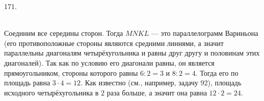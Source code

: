 171. \begin{figure}[ht!]
\end{figure}\\
Соединим все середины сторон. Тогда $MNKL$ --- это параллелограмм Вариньона (его противоположные стороны являются средними линиями, а значит параллельны диагоналям четырёхугольника и равны друг другу и половинам этих диагоналей). Так как по условию его диагонали равны, он является прямоугольником, стороны которого равны $6:2=3$ и $8:2=4.$ Тогда его по площадь равна $3\cdot4=12.$ Как известно (см., например, задачу 92), площадь исходного четырёхугольника в 2 раза больше, а значит она равна $12\cdot2=24.$\\
